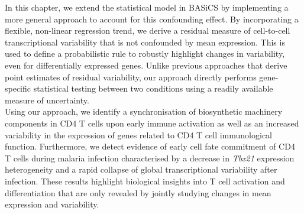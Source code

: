 In this chapter, we extend the statistical model in BASiCS by implementing a more general approach to account for this confounding effect. 
By incorporating a flexible, non-linear regression trend, we derive a residual measure of cell-to-cell transcriptional variability that is not confounded by mean expression. 
This is used to define a probabilistic rule to robustly highlight changes in variability, even for differentially expressed genes. 
Unlike previous approaches that derive point estimates of residual variability, our approach directly performs gene-specific statistical testing between two conditions using a readily available measure of uncertainty. \\

Using our approach, we identify a synchronisation of  biosynthetic machinery components in CD4\plus{} T cells upon early immune activation as well as an increased variability in the expression of genes related to CD4\plus{} T cell immunological function.
Furthermore, we detect evidence of early cell fate commitment of CD4\plus{} T cells during malaria infection characterised by a decrease in \textit{Tbx21} expression heterogeneity and a rapid collapse of global transcriptional variability after infection. 
These results highlight biological insights into T cell activation and differentiation that are only revealed by jointly studying changes in mean expression and variability.
